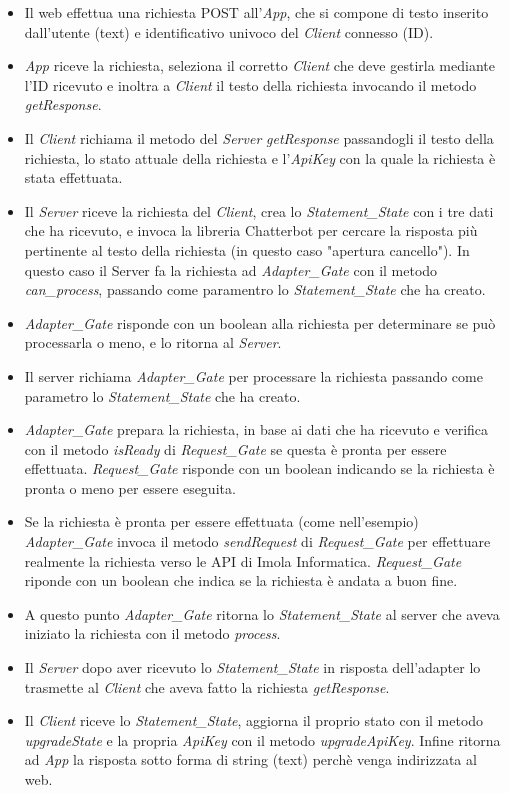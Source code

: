 \begin{itemize}
    \item Il  web effettua una richiesta POST all'\textit{App}, che si compone di testo inserito dall'utente (text) e identificativo univoco del \textit{Client} connesso (ID).
    \item \textit{App} riceve la richiesta, seleziona il corretto \textit{Client} che deve gestirla mediante l'ID ricevuto e inoltra a \textit{Client} il testo della richiesta invocando il metodo \textit{getResponse}.
    \item Il \textit{Client} richiama il metodo del \textit{Server} \textit{getResponse} passandogli il testo della richiesta, lo stato attuale della richiesta e l'\textit{ApiKey} con la quale la richiesta è stata effettuata.
    \item Il \textit{Server} riceve la richiesta del \textit{Client}, crea lo \textit{Statement\_State} con i tre dati che ha ricevuto, e invoca la libreria Chatterbot per cercare la risposta più pertinente al testo della richiesta (in questo caso "apertura cancello"). In questo caso il Server fa la richiesta ad \textit{Adapter\_Gate} con il metodo \textit{can\_process}, passando come paramentro lo \textit{Statement\_State} che ha creato.
    \item \textit{Adapter\_Gate} risponde con un boolean alla richiesta per determinare se può processarla o meno, e lo ritorna al \textit{Server}.
    \item Il server richiama \textit{Adapter\_Gate} per processare la richiesta passando come parametro lo \textit{Statement\_State} che ha creato.
    \item \textit{Adapter\_Gate} prepara la richiesta, in base ai dati che ha ricevuto e verifica con il metodo \textit{isReady} di \textit{Request\_Gate} se questa è pronta per essere effettuata. \textit{Request\_Gate} risponde con un boolean indicando se la richiesta è pronta o meno per essere eseguita.
    \item Se la richiesta è pronta per essere effettuata (come nell'esempio) \textit{Adapter\_Gate} invoca il metodo \textit{sendRequest} di \textit{Request\_Gate} per effettuare realmente la richiesta verso le API di Imola Informatica. \textit{Request\_Gate} riponde con un boolean che indica se la richiesta è andata a buon fine.
    \item A questo punto \textit{Adapter\_Gate} ritorna lo \textit{Statement\_State} al server che aveva iniziato la richiesta con il metodo \textit{process}.
    \item Il \textit{Server} dopo aver ricevuto lo \textit{Statement\_State} in risposta dell'adapter lo trasmette al \textit{Client} che aveva fatto la richiesta \textit{getResponse}.
    \item Il \textit{Client} riceve lo \textit{Statement\_State}, aggiorna il proprio stato con il metodo \textit{upgradeState} e la propria \textit{ApiKey} con il metodo \textit{upgradeApiKey}. Infine ritorna ad \textit{App} la risposta sotto forma di string (text) perchè venga indirizzata al  web.
\end{itemize}
